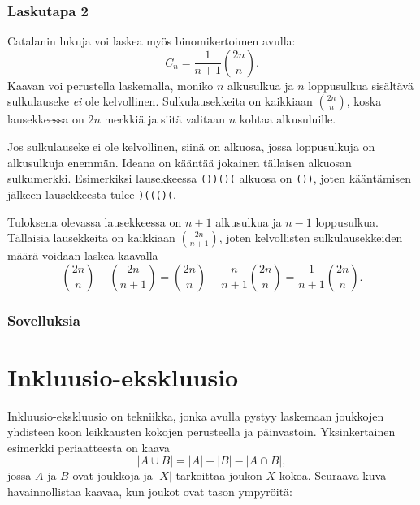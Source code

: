 \subsubsection{Laskutapa 2}

Catalanin lukuja voi laskea myös binomikertoimen avulla:
\[ C_n = \frac{1}{n+1} {2n \choose n}. \]
Kaavan voi perustella laskemalla, moniko $n$ alkusulkua
ja $n$ loppusulkua sisältävä sulkulauseke \textit{ei}
ole kelvollinen.
Sulkulausekkeita on kaikkiaan ${2n \choose n}$,
koska lausekkeessa on $2n$ merkkiä ja siitä valitaan
$n$ kohtaa alkusuluille.

Jos sulkulauseke ei ole kelvollinen,
siinä on alkuosa, jossa loppusulkuja on alkusulkuja
enemmän.
Ideana on kääntää jokainen tällaisen alkuosan
sulkumerkki.
Esimerkiksi lausekkeessa \texttt{())()(}
alkuosa on \texttt{())}, joten kääntämisen
jälkeen lausekkeesta tulee \texttt{)((()(}.

Tuloksena olevassa lausekkeessa on $n+1$ alkusulkua
ja $n-1$ loppusulkua. Tällaisia lausekkeita on
kaikkiaan ${2n \choose n+1}$, joten kelvollisten
sulkulausekkeiden määrä voidaan laskea kaavalla
\[{2n \choose n}-{2n \choose n+1} = {2n \choose n} - \frac{n}{n+1} {2n \choose n} = \frac{1}{n+1} {2n \choose n}.\]

\subsubsection{Sovelluksia}

\section{Inkluusio-ekskluusio}

Inkluusio-ekskluusio
on tekniikka, jonka avulla pystyy laskemaan
joukkojen yhdisteen koon leikkausten
kokojen perusteella ja päinvastoin.
Yksinkertainen esimerkki periaatteesta on kaava
\[ |A \cup B| = |A| + |B| - |A \cap B|,\]
jossa $A$ ja $B$ ovat joukkoja ja $|X|$
tarkoittaa joukon $X$ kokoa.
Seuraava kuva havainnollistaa kaavaa,
kun joukot ovat tason ympyröitä:

\begin{center}
\end{center}

